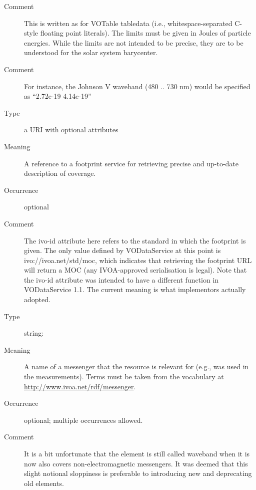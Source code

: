 \documentclass[11pt,a4paper]{ivoa}
\begin{document}
\begin{generated}
\begin{bigdescription}
\begin{description}
\item[Comment] This is written as for VOTable tabledata (i.e.,
                  whitespace-separated C-style floating point literals).
                  The limits must be given in Joules of particle
                  energies.  While the limits are not intended
                  to be precise, they are to be understood for the
                  solar system barycenter.
\item[Comment] For instance, the Johnson V waveband (480 .. 730 nm)
                  would be specified as “2.72e-19 4.14e-19”

\end{description}
\item[Element \xmlel{footprint}]
\begin{description}
\item[Type] a URI with optional attributes
\item[Meaning] A reference to a footprint service for retrieving
                  precise and up-to-date description of coverage.
\item[Occurrence] optional
\item[Comment] The ivo-id attribute here refers to the standard in which
                  the footprint is given.  The only value defined by
                  VODataService at this point is ivo://ivoa.net/std/moc,
                  which indicates that retrieving the footprint URL will return
                  a MOC (any IVOA-approved serialisation is legal).  Note that
                  the ivo-id attribute was intended to have a different
                  function in VODataService 1.1.  The current meaning is what
                  implementors actually adopted.

\end{description}
\item[Element \xmlel{waveband}]
\begin{description}
\item[Type] string: 
\item[Meaning] A name of a messenger that the resource is relevant for
                  (e.g., was used in the measurements).  Terms must
                  be taken from the vocabulary at
                  \url{http://www.ivoa.net/rdf/messenger}.
\item[Occurrence] optional; multiple occurrences allowed.
\item[Comment] It is a bit unfortunate that the element is still called
                  waveband when it is now also covers non-electromagnetic
                  messengers.  It was deemed that this slight notional
                  sloppiness is preferable to introducing new and
                  deprecating old elements.


\end{description}
\end{bigdescription}
\end{generated}
\end{document}
